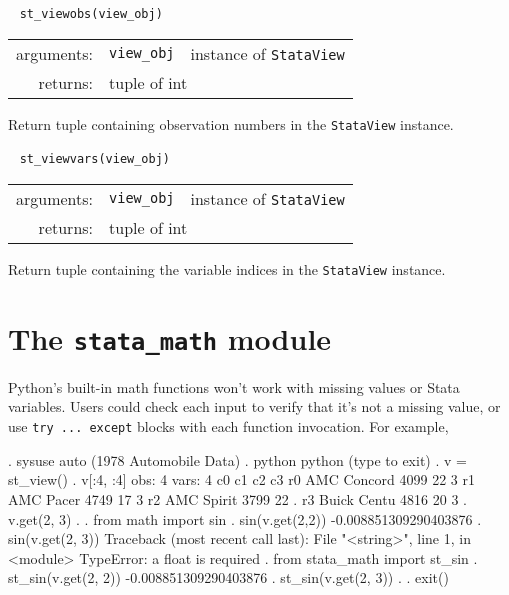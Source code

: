 \documentclass{article}
\begin{document}
			
			\ \newline
			\noindent \lstinline$st_viewobs(view_obj)$
								
			\vspace{1.5mm}
			\noindent 
			\indent \begin{tabular}{rrl}
				arguments: & \texttt{view\_obj} & instance of \lstinline$StataView$ \\
					returns: & \multicolumn{2}{l}{tuple of int}
				\end{tabular}
								
			\vspace{1.5mm}
			\noindent Return tuple containing observation numbers in the \lstinline$StataView$ instance. \newline
			
			
			\ \newline
			\noindent \lstinline$st_viewvars(view_obj)$
								
			\vspace{1.5mm}
			\noindent 
			\indent \begin{tabular}{rrl}
				arguments: & \texttt{view\_obj} & instance of \lstinline$StataView$ \\
					returns: & \multicolumn{2}{l}{tuple of int}
				\end{tabular}
								
			\vspace{1.5mm}
			\noindent Return tuple containing the variable indices in the \lstinline$StataView$ instance. \newline
  
	
\section{The \lstinline$stata_math$ module} \label{stata_math_module}

Python's built-in math functions won't work with missing values or Stata variables. Users could check each input to verify that it's not a missing value, or use \lstinline{try ... except} blocks with each function invocation. For example,

\begin{stlog}
{\smallskip}
. sysuse auto
(1978 Automobile Data)
{\smallskip}
. python
 python (type {} to exit) 
{\bftt{>>>}}. v = st_view()
{\smallskip}
{\bftt{>>>}}. v[:4, :4]
{\smallskip}
  obs: 4
 vars: 4
{\smallskip}
            c0        c1        c2        c3
r0 AMC Concord      4099        22         3
r1   AMC Pacer      4749        17         3
r2  AMC Spirit      3799        22         .
r3 Buick Centu      4816        20         3
{\smallskip}
{\bftt{>>>}}. v.get(2, 3)
.
{\smallskip}
{\bftt{>>>}}. from math import sin
{\smallskip}
{\bftt{>>>}}. sin(v.get(2,2))
-0.008851309290403876
{\smallskip}
{\bftt{>>>}}. sin(v.get(2, 3))
{\color{red}Traceback (most recent call last):
  File "<string>", line 1, in <module>
TypeError: a float is required}
{\smallskip}
{\bftt{>>>}}. from stata_math import st_sin
{\smallskip}
{\bftt{>>>}}. st_sin(v.get(2, 2))
-0.008851309290403876
{\smallskip}
{\bftt{>>>}}. st_sin(v.get(2, 3))
.
{\smallskip}
{\bftt{>>>}}. exit()
\end{stlog}
\end{document}
